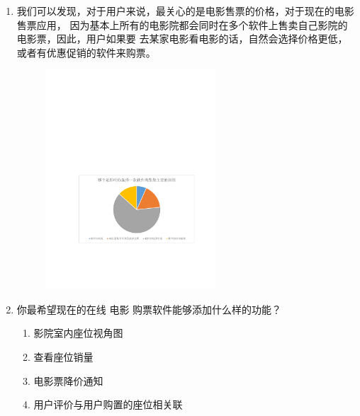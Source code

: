\documentclass[a4paper]{article}
\begin{document}
\begin{enumerate}
\begin{figure}[H]
\end{figure}
  \item 我们可以发现，对于用户来说，最关心的是电影售票的价格，对于现在的电影售票应用，
因为基本上所有的电影院都会同时在多个软件上售卖自己影院的电影票，因此，用户如果要
去某家电影看电影的话，自然会选择价格更低，或者有优惠促销的软件来购票。
\begin{figure}[H]
  \centering
  \includegraphics[width=0.6\textwidth]{figure/5.pdf}
\end{figure}
  \item 你最希望现在的在线 电影 购票软件能够添加什么样的功能？
    \begin{enumerate}
      \item 影院室内座位视角图
      \item 查看座位销量
      \item 电影票降价通知
      \item 用户评价与用户购置的座位相关联
    \end{enumerate}
\end{enumerate}
\end{document}
